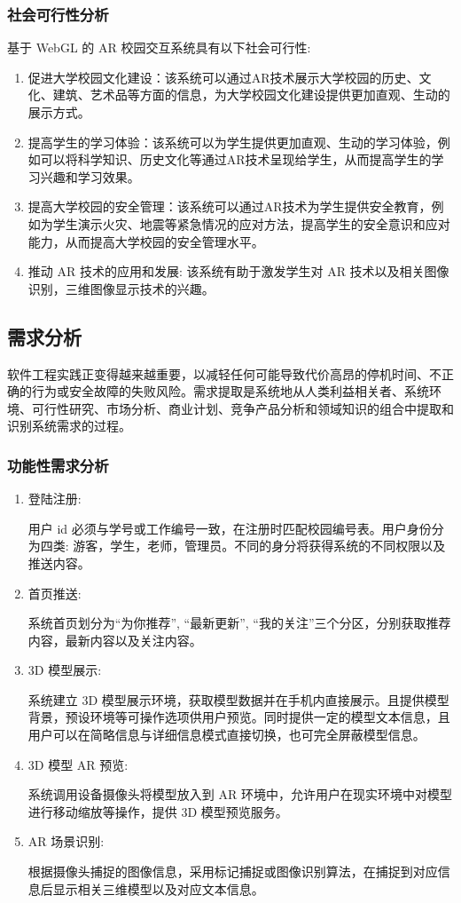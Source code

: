 \subsubsection{社会可行性分析}

基于 WebGL 的 AR 校园交互系统具有以下社会可行性:
\begin{enumerate}
  \item 促进大学校园文化建设：该系统可以通过AR技术展示大学校园的历史、文化、建筑、艺术品等方面的信息，为大学校园文化建设提供更加直观、生动的展示方式。
  \item 提高学生的学习体验：该系统可以为学生提供更加直观、生动的学习体验，例如可以将科学知识、历史文化等通过AR技术呈现给学生，从而提高学生的学习兴趣和学习效果。
  \item 提高大学校园的安全管理：该系统可以通过AR技术为学生提供安全教育，例如为学生演示火灾、地震等紧急情况的应对方法，提高学生的安全意识和应对能力，从而提高大学校园的安全管理水平。
  \item 推动 AR 技术的应用和发展: 该系统有助于激发学生对 AR 技术以及相关图像识别，三维图像显示技术的兴趣。
\end{enumerate}

\subsection{需求分析}

软件工程实践正变得越来越重要，以减轻任何可能导致代价高昂的停机时间、不正确的行为或安全故障的失败风险。需求提取是系统地从人类利益相关者、系统环境、可行性研究、市场分析、商业计划、竞争产品分析和领域知识的组合中提取和识别系统需求的过程。\cite{jabar2012software}

\subsubsection{功能性需求分析}

\begin{enumerate}
  \item 登陆注册: 
  
  用户 id 必须与学号或工作编号一致，在注册时匹配校园编号表。用户身份分为四类: 游客，学生，老师，管理员。不同的身分将获得系统的不同权限以及推送内容。
  \item 首页推送: 
  
  系统首页划分为``为你推荐'', ``最新更新'', ``我的关注''三个分区，分别获取推荐内容，最新内容以及关注内容。
  \item 3D 模型展示: 
  
  系统建立 3D 模型展示环境，获取模型数据并在手机内直接展示。且提供模型背景，预设环境等可操作选项供用户预览。同时提供一定的模型文本信息，且用户可以在简略信息与详细信息模式直接切换，也可完全屏蔽模型信息。

  \item 3D 模型 AR 预览:
  
  系统调用设备摄像头将模型放入到 AR 环境中，允许用户在现实环境中对模型进行移动缩放等操作，提供 3D 模型预览服务。

  \item AR 场景识别:
  
  根据摄像头捕捉的图像信息，采用标记捕捉或图像识别算法，在捕捉到对应信息后显示相关三维模型以及对应文本信息。
\end{enumerate}

